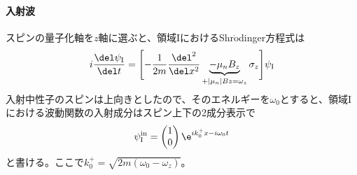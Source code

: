 \renewcommand{\arraystretch}{1.5}

\paragraph{入射波}
スピンの量子化軸を$z$軸に選ぶと、領域IにおけるShr$\ddot{\mathrm{o}}$dinger方程式は%
\begin{equation}
i\frac{\del \psi_\mathrm{I}}{\del t}= \Biggl[-\frac{1}{2m} \frac{\del^2}{\del x^2} \underbrace{-\mu_nB_z}_{+|\mu_n|Bz =\omega_z} \sigma_z\Biggr] \psi_\mathrm{I}
\end{equation}
入射中性子のスピンは上向きとしたので、そのエネルギーを$\omega_0$とすると、領域Iにおける波動関数の入射成分はスピン上下の2成分表示で
\begin{equation}
\psi_\mathrm{I}^{\mathrm{in}}=\begin{pmatrix} 1\\0 \end{pmatrix} \e^{i k_0^+ x -i\omega_0 t}
\end{equation}
と書ける。ここで$k_0^+=\sqrt{2m(\omega_0 -\omega_z)}$。
\renewcommand{\arraystretch}{1}

